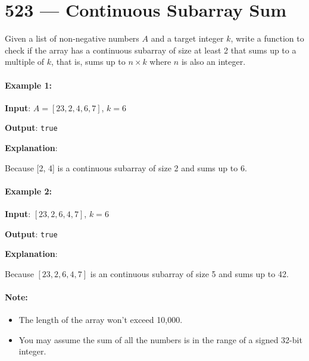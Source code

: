 \section{523 --- Continuous Subarray Sum}
Given a list of non-negative numbers $A$ and a target integer $k$, write a function to check if the array has a continuous subarray of size at least 2 that sums up to a multiple of $k$, that is, sums up to $n\times k$ where $n$ is also an integer.

\paragraph{Example 1:}

\begin{flushleft}
\textbf{Input}: $ A = [23, 2, 4, 6, 7] $,  $ k=6 $

\textbf{Output}: \texttt{true}

\textbf{Explanation}: 

Because [2, 4] is a continuous subarray of size 2 and sums up to 6.
\end{flushleft}

\paragraph{Example 2:}

\begin{flushleft}
\textbf{Input}: $[23, 2, 6, 4, 7]$,  $ k=6 $

\textbf{Output}: \texttt{true}

\textbf{Explanation}: 

Because $[23, 2, 6, 4, 7]$ is an continuous subarray of size 5 and sums up to 42.

\end{flushleft}

 

\paragraph{Note:}

\begin{itemize}
\item The length of the array won't exceed 10,000.
\item You may assume the sum of all the numbers is in the range of a signed 32-bit integer.
\end{itemize}

